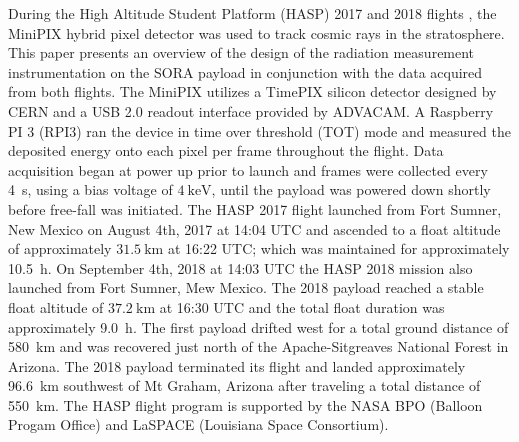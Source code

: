 During the High Altitude Student Platform (HASP) 2017 and 2018 flights \cite{hasp}, the MiniPIX hybrid pixel detector\cite{minipix} was used to track cosmic rays in the stratosphere. 
%
This paper presents an overview of the design of the radiation measurement  instrumentation on the SORA payload in conjunction with the data acquired  from both flights.
%
The MiniPIX utilizes a TimePIX\cite{timepix} silicon detector designed by CERN\cite{cern} and a USB 2.0 readout interface provided by ADVACAM\cite{advacam}. 
%
A Raspberry PI 3 (RPI3) ran the device in time over threshold (TOT) mode and measured the deposited energy onto each pixel per frame throughout the flight. 
%
Data acquisition began at power up prior to launch and frames were collected every \SI{4}{\second}, using a bias voltage of $\SI{4}{\kilo\electronvolt}$, until the payload was powered down shortly before free-fall was initiated. 
%
The HASP 2017 flight launched from Fort Sumner, New Mexico on August 4th, 2017 at 14:04 UTC and ascended to a float altitude of approximately $\SI{31.5}{\kilo\meter}$ at 16:22 UTC; which was maintained for approximately \SI{10.5}{\hour}. On September 4th, 2018 at 14:03 UTC the HASP 2018 mission also launched from Fort Sumner, Mew Mexico.  The 2018 payload reached a stable float altitude of $\SI{37.2}{\kilo\meter}$ at 16:30 UTC and the total float duration was approximately \SI{9.0}{\hour}.
%
 The first payload drifted west for a total ground distance of \SI{580}{\kilo\meter} and was recovered just north of the Apache-Sitgreaves National Forest in Arizona. 
 The 2018 payload terminated its flight and landed approximately \SI{96.6}{\kilo\meter} southwest of Mt Graham, Arizona after traveling a total distance of \SI{550}{\kilo\meter}.
 The HASP flight program is supported by the NASA BPO (Balloon Progam Office) and LaSPACE (Louisiana Space Consortium).
